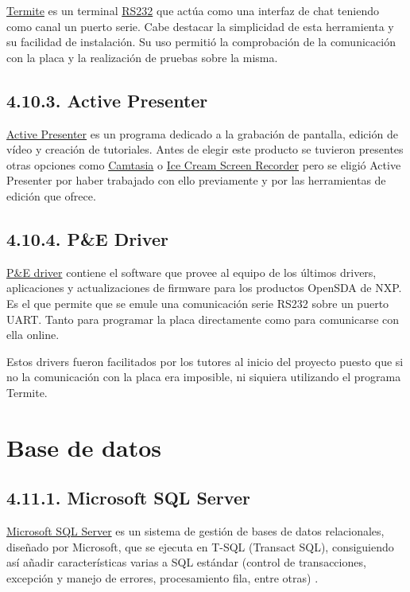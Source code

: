 \href{https://www.compuphase.com/software_termite.htm}{Termite} es un terminal \href{https://es.wikipedia.org/wiki/RS-232}{RS232} que actúa como una interfaz de chat teniendo como canal un puerto serie. Cabe destacar la simplicidad de esta herramienta y su facilidad de instalación. Su uso permitió la comprobación de la comunicación con la placa y la realización de pruebas sobre la misma.

\subsection{4.10.3. Active Presenter}

\href{https://atomisystems.com/activepresenter/}{Active Presenter} es un programa dedicado a la grabación de pantalla, edición de vídeo y creación de tutoriales. Antes de elegir este producto se tuvieron presentes otras opciones como \href{https://www.techsmith.com/video-editor.html}{Camtasia} o \href{https://icecreamapps.com/Screen-Recorder/}{Ice Cream Screen Recorder} pero se eligió Active Presenter por haber trabajado con ello previamente y por las herramientas de edición que ofrece.

\subsection{4.10.4. P\&E Driver}

\href{http://www.pemicro.com/opensda/}{P\&E driver} contiene el software que provee al equipo de los últimos drivers, aplicaciones y actualizaciones de firmware para los productos OpenSDA de NXP. Es el que permite que se emule una comunicación serie RS232 sobre un puerto UART. Tanto para programar la placa directamente como para comunicarse con ella online.

Estos drivers fueron facilitados por los tutores al inicio del proyecto puesto que si no la comunicación con la placa era imposible, ni siquiera utilizando el programa Termite.

\section{Base de datos}

\subsection{4.11.1. Microsoft SQL Server}

\href{https://www.microsoft.com/es-es/sql-server/sql-server-2017}{Microsoft SQL Server} es un sistema de gestión de bases de datos relacionales, diseñado por Microsoft, que se ejecuta en T-SQL (Transact SQL), consiguiendo así añadir características varias a SQL estándar (control de transacciones, excepción y manejo de errores, procesamiento fila, entre otras) \cite{web:sqlServer}.

